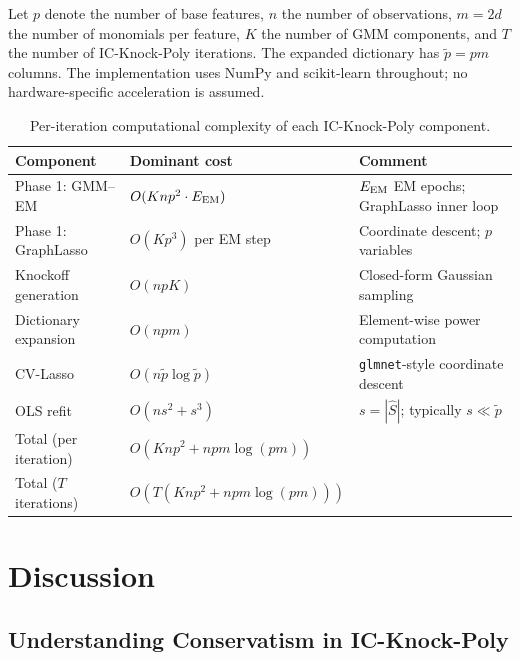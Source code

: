 \documentclass[11pt, a4paper]{article}
\newcommand{\OO}{O}
\begin{document}
Let $p$ denote the number of base features, $n$ the number of observations,
$m = 2d$ the number of monomials per feature, $K$ the number of GMM
components, and $T$ the number of IC-Knock-Poly iterations.  The expanded
dictionary has $\tilde p = pm$ columns.  The implementation uses NumPy and
scikit-learn throughout; no hardware-specific acceleration is assumed.

\begin{table}[H]
\centering
\caption{Per-iteration computational complexity of each IC-Knock-Poly
component.}
\label{tab:complexity}
\begin{tabular}{@{}lll@{}}
\toprule
\textbf{Component} & \textbf{Dominant cost} & \textbf{Comment} \\
\midrule
Phase 1: GMM--EM & $\OO(K n p^2 \cdot E_{\rm EM})$
  & $E_{\rm EM}$ EM epochs; GraphLasso inner loop \\
Phase 1: GraphLasso & $\OO(K p^3)$ per EM step
  & Coordinate descent; $p$ variables \\
Knockoff generation & $\OO(n p K)$
  & Closed-form Gaussian sampling \\
Dictionary expansion & $\OO(n p m)$
  & Element-wise power computation \\
CV-Lasso & $\OO(n \tilde p \log \tilde p)$
  & \texttt{glmnet}-style coordinate descent \\
OLS refit & $\OO(n s^2 + s^3)$
  & $s = |\hat S|$; typically $s \ll \tilde p$ \\
\midrule
Total (per iteration) & $\OO(K n p^2 + n p m \log(pm))$ & \\
Total ($T$ iterations) & $\OO(T(K n p^2 + n p m \log(pm)))$ & \\
\bottomrule
\end{tabular}
\end{table}


\section{Discussion}
\label{sec:discussion}

\subsection{Understanding Conservatism in IC-Knock-Poly}
\end{document}
